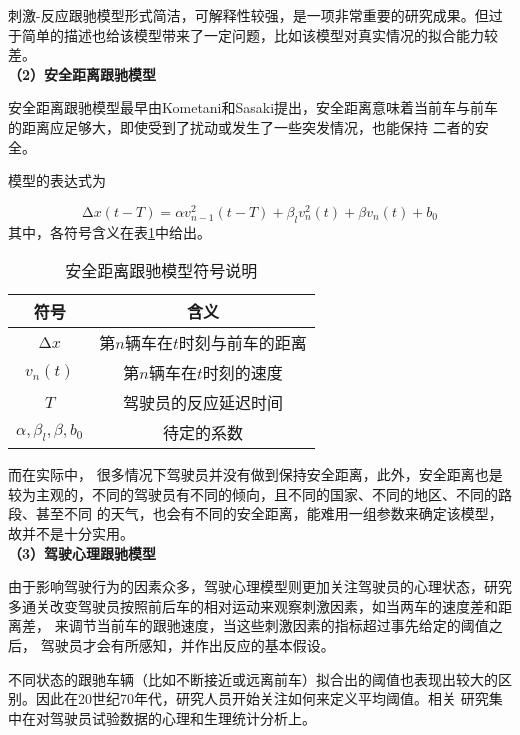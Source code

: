 刺激-反应跟驰模型形式简洁，可解释性较强，是一项非常重要的研究成果。但过于简单的描述也给该模型带来了一定问题，比如该模型对真实情况的拟合能力较差。 \\

\noindent \textbf{（2）安全距离跟驰模型}

安全距离跟驰模型最早由Kometani和Sasaki\cite{ckome1958on}提出，安全距离意味着当前车与前车的距离应足够大，即使受到了扰动或发生了一些突发情况，也能保持
二者的安全。

模型的表达式为

\begin{equation}
  \increment{x}(t-T) = \alpha v_{n-1}^2(t-T) + \beta_lv_n^2(t) + \beta v_n(t) + b_0
  \label{eq:chap01-3}
\end{equation}
其中，各符号含义在表\ref{tab:chap01-4}中给出。

\begin{table}
  \centering
  \caption{安全距离跟驰模型符号说明}
  \begin{tabular}{cc}
    \toprule
    符号          &  含义                         \\
    \midrule
    $\increment{x}$   & 第$n$辆车在$t$时刻与前车的距离        \\
    $v_n(t)$          & 第$n$辆车在$t$时刻的速度         \\
    $T$        & 驾驶员的反应延迟时间  \\
    $\alpha ,\beta_l , \beta , b_0$        & 待定的系数         \\
    \bottomrule
  \end{tabular}
  \label{tab:chap01-4}
\end{table}

而在实际中， 很多情况下驾驶员并没有做到保持安全距离，此外，安全距离也是较为主观的，不同的驾驶员有不同的倾向，且不同的国家、不同的地区、不同的路段、甚至不同
的天气，也会有不同的安全距离，能难用一组参数来确定该模型，故并不是十分实用。\\

\noindent \textbf{（3）驾驶心理跟驰模型}

由于影响驾驶行为的因素众多，驾驶心理模型则更加关注驾驶员的心理状态，研究多通关改变驾驶员按照前后车的相对运动来观察刺激因素，如当两车的速度差和距离差，
来调节当前车的跟驰速度，当这些刺激因素的指标超过事先给定的阈值之后， 驾驶员才会有所感知，并作出反应的基本假设。\cite{Todosiev1963the}

不同状态的跟驰车辆（比如不断接近或远离前车）拟合出的阈值也表现出较大的区别。因此在20世纪70年代，研究人员开始关注如何来定义平均阈值。相关
研究集中在对驾驶员试验数据的心理和生理统计分析上。

